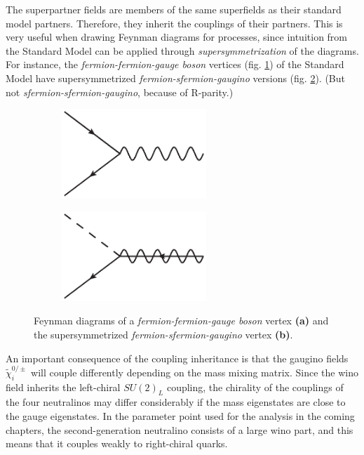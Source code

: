  The superpartner fields are members of the same superfields as their standard model partners. Therefore, they inherit the couplings of their partners. This is very useful when drawing Feynman diagrams for processes, since intuition from the Standard Model can be applied through {\it supersymmetrization} of the diagrams. For instance, the {\it fermion-fermion-gauge boson} vertices (fig. \ref{fig:feynmandiagram_supersymmetrization_a}) of the Standard Model have supersymmetrized {\it fermion-sfermion-gaugino} versions (fig. \ref{fig:feynmandiagram_supersymmetrization_b}). (But not {\it sfermion-sfermion-gaugino}, because of R-parity.) 
 \begin{figure}[htbp]
	\centering
	\begin{subfigure}[b]{0.45\textwidth}
		\centering
		\includegraphics[width=0.6\textwidth]{figures/susyintro/ffg_vertex.eps}
		\caption{ }
		\label{fig:feynmandiagram_supersymmetrization_a}
	\end{subfigure}
	\begin{subfigure}[b]{0.45\textwidth}
		\centering
		\includegraphics[width=0.6\textwidth]{figures/susyintro/sfg_vertex.eps}
		\caption{ }
		\label{fig:feynmandiagram_supersymmetrization_b}
	\end{subfigure}
	\caption{Feynman diagrams of a {\it fermion-fermion-gauge boson} vertex {\bf (a)} and the supersymmetrized {\it fermion-sfermion-gaugino} vertex {\bf (b)}.}
	\label{fig:feynmandiagram_supersymmetrization}
\end{figure}
An important consequence of the coupling inheritance is that the gaugino fields $\tilde\chi_i^{0/\pm}$ will couple differently depending on the mass mixing matrix. Since the wino field inherits the left-chiral $SU(2)_L$ coupling, the chirality of the couplings of the four neutralinos may differ considerably if the mass eigenstates are close to the gauge eigenstates. In the parameter point used for the analysis in the coming chapters, the second-generation neutralino consists of a large wino part, and this means that it couples weakly to right-chiral quarks. 

